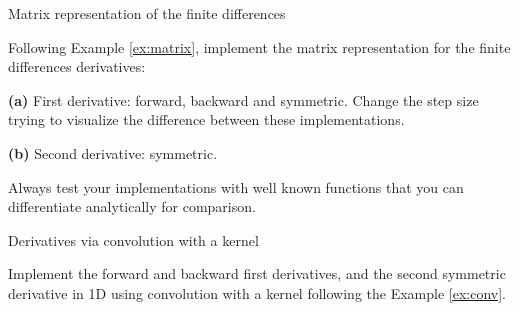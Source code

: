 \begin{problem}{Matrix representation of the finite differences}
 \label{prob:matrix}

 Following Example \ref{ex:matrix}, implement the matrix representation for the finite differences derivatives:
 
 \textbf{(a)} First derivative: forward, backward and symmetric. Change the step size trying to visualize the difference between these implementations.
 
 \textbf{(b)} Second derivative: symmetric.
 
 Always test your implementations with well known functions that you can differentiate analytically for comparison.
 
\end{problem}


\begin{problem}{Derivatives via convolution with a kernel}
 \label{prob:kernel}

 Implement the forward and backward first derivatives, and the second symmetric derivative in 1D using convolution with a kernel following the Example \ref{ex:conv}.
 
\end{problem}












